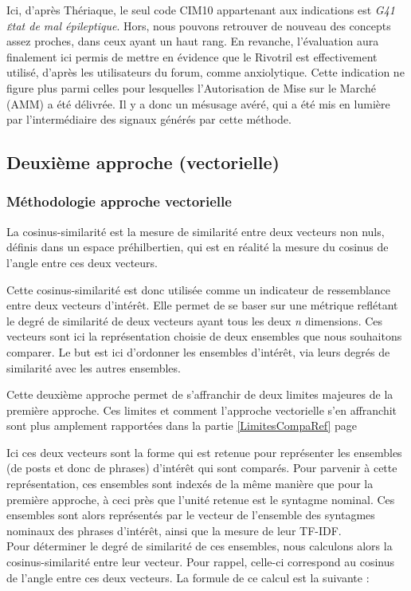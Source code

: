 \documentclass[a4paper, 12pt, openany, oneside, abstract=on]{article} %
\begin{document}
Ici, d'après Thériaque, le seul code CIM10 appartenant aux indications est \emph{G41 \textsc{é}tat de mal épileptique}. Hors, nous pouvons retrouver de nouveau des concepts assez proches, dans ceux ayant un haut rang. En revanche, l'évaluation aura finalement ici permis de mettre en évidence que le Rivotril est effectivement utilisé, d'après les utilisateurs du forum, comme anxiolytique. Cette indication ne figure plus parmi celles pour lesquelles l'Autorisation de Mise sur le Marché (AMM) a été délivrée. Il y a donc un mésusage avéré, qui a été mis en lumière par l'intermédiaire des signaux générés par cette méthode.

\subsection{Deuxième approche (vectorielle)}
\label{MtdVect}

\subsubsection{Méthodologie approche vectorielle}
La cosinus-similarité est la mesure de similarité entre deux vecteurs non nuls, définis dans un espace préhilbertien, qui est en réalité la mesure du cosinus de l'angle entre ces deux vecteurs.

Cette cosinus-similarité est donc utilisée comme un indicateur de ressemblance entre deux vecteurs d'intérêt. Elle permet de se baser sur une métrique reflétant le degré de similarité de deux vecteurs ayant tous les deux \emph{n} dimensions. Ces vecteurs sont ici la représentation choisie de deux ensembles que nous souhaitons comparer. Le but est ici d'ordonner les ensembles d'intérêt, via leurs degrés de similarité avec les autres ensembles.

Cette deuxième approche permet de s'affranchir de deux limites majeures de la première approche. Ces limites et comment l'approche vectorielle s'en affranchit sont plus amplement rapportées dans la partie \ref{LimitesCompaRef} page \pageref{LimitesCompaRef}

Ici ces deux vecteurs sont la forme qui est retenue pour représenter les ensembles (de posts et donc de phrases) d'intérêt qui sont comparés. Pour parvenir à cette représentation, ces ensembles sont indexés de la même manière que pour la première approche, à ceci près que l'unité retenue est le syntagme nominal. Ces ensembles sont alors représentés par le vecteur de l'ensemble des syntagmes nominaux des phrases d'intérêt, ainsi que la mesure de leur TF-IDF.\\
Pour déterminer le degré de similarité de ces ensembles, nous calculons alors la cosinus-similarité entre leur vecteur. Pour rappel, celle-ci correspond au cosinus de l'angle entre ces deux vecteurs. La formule de ce calcul est la suivante :\\
\end{document}
